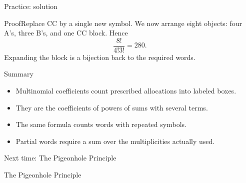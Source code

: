 \documentclass[aspectratio=169,11pt]{beamer}
\renewcommand{\Proof}[1]{\begin{block}{Proof}\normalsize #1\end{block}}
\begin{document}
\begin{frame}{Practice: solution}
\large
\Proof{Replace CC by a single new symbol. We now arrange eight objects: four A's, three B's, and one CC block. Hence
\[\frac{8!}{4!3!}=280.\]
Expanding the block is a bijection back to the required words.}
\end{frame}
\begin{frame}{Summary}
\large
\begin{itemize}
\item Multinomial coefficients count prescribed allocations into labeled boxes.
\item They are the coefficients of powers of sums with several terms.
\item The same formula counts words with repeated symbols.
\item Partial words require a sum over the multiplicities actually used.
\end{itemize}
\end{frame}
\begin{frame}{Next time: The Pigeonhole Principle}\begin{center}{\Huge The Pigeonhole Principle}\end{center}\end{frame}
\end{document}
